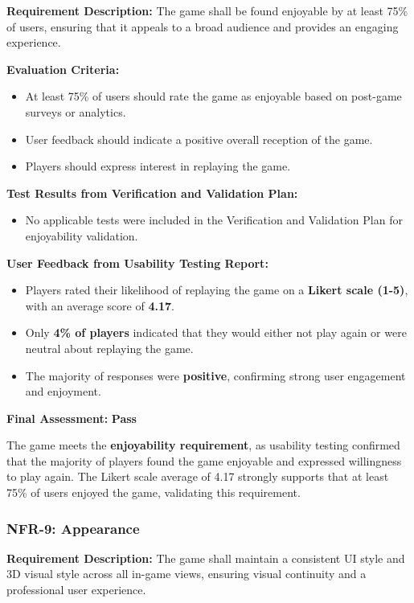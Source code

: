 \documentclass[12pt, titlepage]{article}
\begin{document}
\textbf{Requirement Description:}  
The game shall be found enjoyable by at least 75\% of users, ensuring that it appeals to a broad audience and provides an engaging experience.

\textbf{Evaluation Criteria:}  
\begin{itemize}
    \item At least 75\% of users should rate the game as enjoyable based on post-game surveys or analytics.
    \item User feedback should indicate a positive overall reception of the game.
    \item Players should express interest in replaying the game.
\end{itemize}

\textbf{Test Results from Verification and Validation Plan:}  
\begin{itemize}
    \item No applicable tests were included in the Verification and Validation Plan for enjoyability validation.
\end{itemize}

\textbf{User Feedback from Usability Testing Report:}  
\begin{itemize}
    \item Players rated their likelihood of replaying the game on a \textbf{Likert scale (1-5)}, with an average score of \textbf{4.17}.
    \item Only \textbf{4\% of players} indicated that they would either not play again or were neutral about replaying the game.
    \item The majority of responses were \textbf{positive}, confirming strong user engagement and enjoyment.
\end{itemize}

\textbf{Final Assessment:} \textbf{Pass} 
 
The game meets the \textbf{enjoyability requirement}, as usability testing confirmed that the majority of players found the game enjoyable and expressed willingness to play again. The Likert scale average of 4.17 strongly supports that at least 75\% of users enjoyed the game, validating this requirement.


\subsubsection{NFR-9: Appearance}
\label{NFR9}

\textbf{Requirement Description:}  
The game shall maintain a consistent UI style and 3D visual style across all in-game views, ensuring visual continuity and a professional user experience.
\end{document}
